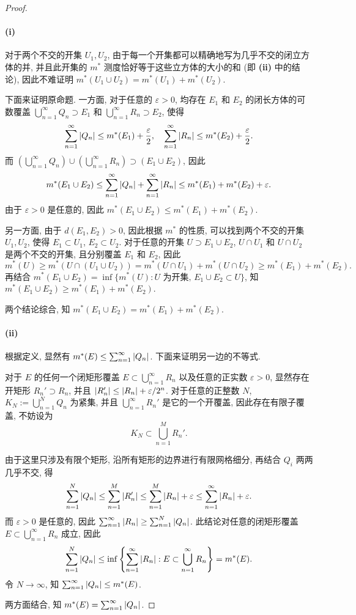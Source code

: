 \documentclass{article}
\begin{document}
\begin{proof}
	\paragraph{(i)} 对于两个不交的开集 $U_1, U_2$, 由于每一个开集都可以精确地写为几乎不交的闭立方体的并, 并且此开集的 $m^*$ 测度恰好等于这些立方体的大小的和 (即 \textbf{(ii)} 中的结论), 因此不难证明 $m^*(U_1 \cup U_2) = m^*(U_1) + m^*(U_2)$.
	
	下面来证明原命题. 一方面, 对于任意的 $\varepsilon>0$, 均存在 $E_1$ 和 $E_2$ 的闭长方体的可数覆盖 $\bigcup_{n = 1}^{\infty}Q_n \supset E_1$ 和 $\bigcup_{n = 1}^{\infty} R_n \supset E_2$, 使得 
	\[ \sum_{n = 1}^{\infty} \left|Q_n\right| \le m^*(E_1) + \frac{\varepsilon}{2}, \quad 
	\sum_{n = 1}^{\infty} \left|R_n\right| \le m^*(E_2) + \frac{\varepsilon}{2}. \]
	而 $(\bigcup_{n=1}^{\infty}Q_n) \cup (\bigcup_{n=1}^{\infty}R_n) \supset (E_1 \cup E_2)$, 因此
	\[ m^*(E_1 \cup E_2) \le \sum_{n=1}^{\infty}\left|Q_n\right| + \sum_{n=1}^{\infty}\left|R_n\right| \le m^*(E_1) + m^*(E_2) + \varepsilon. \]
	由于 $\varepsilon>0$ 是任意的, 因此 $m^*(E_1 \cup E_2) \le m^*(E_1) + m^*(E_2)$.

	另一方面, 由于 $d(E_1, E_2) > 0$, 因此根据 $m^*$ 的性质, 可以找到两个不交的开集 $U_1, U_2$, 使得 $E_1 \subset U_1$, $E_2 \subset U_2$. 对于任意的开集 $U \supset E_1 \cup E_2$, $U \cap U_1$ 和 $U \cap U_2$ 是两个不交的开集, 且分别覆盖 $E_1$ 和 $E_2$, 因此
	\[ m^*(U) \ge m^*(U \cap (U_1 \cup U_2)) = m^*(U \cap U_1) + m^*(U \cap U_2) \ge m^*(E_1) + m^*(E_2). \]
	再结合 $m^*(E_1 \cup E_2) = \inf \{m^*(U): U \text{ 为开集, } E_1 \cup E_2 \subset U\}$, 知 $m^*(E_1 \cup E_2) \ge m^*(E_1) + m^*(E_2)$.

	两个结论综合, 知 $m^*(E_1 \cup E_2) = m^*(E_1) + m^*(E_2)$.

	\paragraph{(ii)} 根据定义, 显然有 $m^*(E) \le \sum_{n=1}^{\infty}\left|Q_n\right|$. 下面来证明另一边的不等式. 

	对于 $E$ 的任何一个闭矩形覆盖 $E \subset \bigcup_{n=1}^{\infty}R_n$ 以及任意的正实数 $\varepsilon>0$, 显然存在开矩形 $R_n' \supset R_n$, 并且 $\left|R_n'\right| \le \left|R_n\right| + \varepsilon/2^n$. 对于任意的正整数 $N$, $K_N := \bigcup_{n=1}^{N}Q_n$ 为紧集, 并且 $\bigcup_{n=1}^{\infty} R_n'$ 是它的一个开覆盖, 因此存在有限子覆盖, 不妨设为
	\[ K_N \subset \bigcup_{n=1}^{M} R_n'. \]
	
	由于这里只涉及有限个矩形, 沿所有矩形的边界进行有限网格细分, 再结合 $Q_i$ 两两几乎不交, 得
	\[ \sum_{n=1}^{N} \left|Q_n\right| \le \sum_{n=1}^{M} \left|R_n'\right| \le \sum_{n=1}^{M} \left|R_n\right| + \varepsilon \le \sum_{n=1}^{\infty} \left|R_n\right| + \varepsilon. \]
	而 $\varepsilon>0$ 是任意的, 因此 $\sum_{n=1}^{\infty}\left|R_n\right| \ge \sum_{n=1}^{N}\left|Q_n\right|$. 此结论对任意的闭矩形覆盖 $E \subset \bigcup_{n=1}^{\infty} R_n$ 成立, 因此
	\[ \sum_{n=1}^{N} \left|Q_n\right| \le \inf \left\{ \sum_{n=1}^{\infty} \left|R_n\right|: E \subset \bigcup_{n=1}^{\infty} R_n \right\} = m^*(E). \]
	令 $N \to \infty$, 知 $\sum_{n=1}^{\infty} \left|Q_n\right| \le m^*(E)$. 

	两方面结合, 知 $m^*(E) = \sum_{n=1}^{\infty}\left|Q_n\right|$.
\end{proof}
\end{document}
